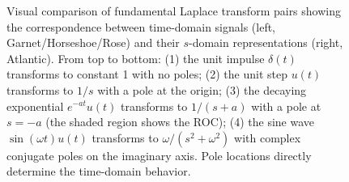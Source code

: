 \begin{figure}[htbp]
\caption{Visual comparison of fundamental Laplace transform pairs showing the correspondence between time-domain signals (left, Garnet/Horseshoe/Rose) and their $s$-domain representations (right, Atlantic). From top to bottom: (1) the unit impulse $\delta(t)$ transforms to constant 1 with no poles; (2) the unit step $u(t)$ transforms to $1/s$ with a pole at the origin; (3) the decaying exponential $e^{-at}u(t)$ transforms to $1/(s+a)$ with a pole at $s=-a$ (the shaded region shows the ROC); (4) the sine wave $\sin(\omega t)u(t)$ transforms to $\omega/(s^2+\omega^2)$ with complex conjugate poles on the imaginary axis. Pole locations directly determine the time-domain behavior.}
\label{fig:laplace_time_domain_pairs}
\end{figure}
